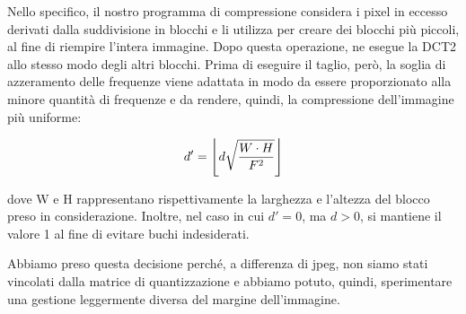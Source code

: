 Nello specifico, il nostro programma di compressione considera i pixel in eccesso derivati dalla suddivisione in blocchi e li utilizza per creare dei blocchi più piccoli, al fine di riempire l'intera immagine. Dopo questa operazione, ne esegue la DCT2 allo stesso modo degli altri blocchi. Prima di eseguire il taglio, però, la soglia di azzeramento delle frequenze viene adattata in modo da essere proporzionato alla minore quantità di frequenze e da rendere, quindi, la compressione dell'immagine più uniforme:

$$d' = \floor*{d  \sqrt{ \frac{W \cdot H}{F^{2}}}}$$

dove W e H rappresentano rispettivamente la larghezza e l'altezza del blocco preso in considerazione.
Inoltre, nel caso in cui $d'=0$, ma $d>0$, si mantiene il valore 1 al fine di evitare buchi indesiderati.

Abbiamo preso questa decisione perché, a differenza di jpeg, non siamo stati vincolati dalla matrice di quantizzazione e abbiamo potuto, quindi, sperimentare una gestione leggermente diversa del margine dell'immagine.


